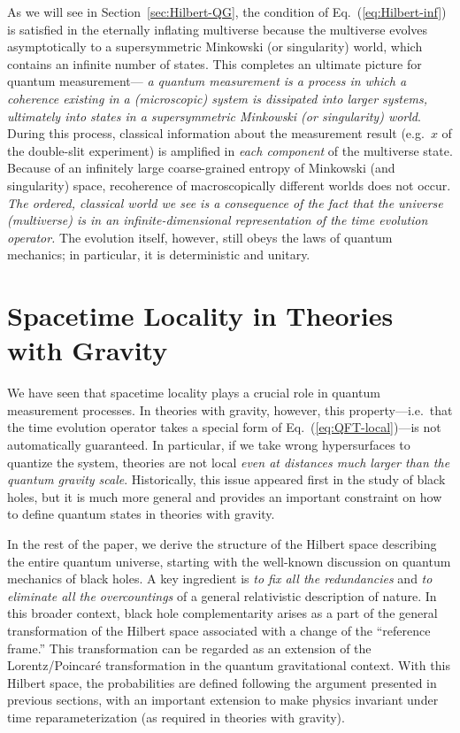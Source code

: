 \documentclass[12pt]{article}
\begin{document}
As we will see in Section~\ref{sec:Hilbert-QG}, the condition of 
Eq.~(\ref{eq:Hilbert-inf}) is satisfied in the eternally inflating 
multiverse because the multiverse evolves asymptotically to a supersymmetric 
Minkowski (or singularity) world, which contains an infinite number of 
states.  This completes an ultimate picture for quantum measurement---{\it 
a quantum measurement is a process in which a coherence existing in a 
(microscopic) system is dissipated into larger systems, ultimately into 
states in a supersymmetric Minkowski (or singularity) world}.  During 
this process, classical information about the measurement result (e.g.\ 
$x$ of the double-slit experiment) is amplified in {\it each component} 
of the multiverse state.  Because of an infinitely large coarse-grained 
entropy of Minkowski (and singularity) space, recoherence of macroscopically 
different worlds does not occur.  {\it The ordered, classical world we 
see is a consequence of the fact that the universe (multiverse) is in 
an infinite-dimensional representation of the time evolution operator.} 
The evolution itself, however, still obeys the laws of quantum mechanics; 
in particular, it is deterministic and unitary.


\section{Spacetime Locality in Theories with Gravity}
\label{sec:locality-grav}

We have seen that spacetime locality plays a crucial role in quantum 
measurement processes.  In theories with gravity, however, this 
property---i.e.\ that the time evolution operator takes a special 
form of Eq.~(\ref{eq:QFT-local})---is not automatically guaranteed. 
In particular, if we take wrong hypersurfaces to quantize the system, 
theories are not local {\it even at distances much larger than the quantum 
gravity scale}.  Historically, this issue appeared first in the study 
of black holes, but it is much more general and provides an important 
constraint on how to define quantum states in theories with gravity.

In the rest of the paper, we derive the structure of the Hilbert space 
describing the entire quantum universe, starting with the well-known 
discussion on quantum mechanics of black holes.  A key ingredient is {\it 
to fix all the redundancies} and {\it to eliminate all the overcountings} 
of a general relativistic description of nature.  In this broader 
context, black hole complementarity arises as a part of the general 
transformation of the Hilbert space associated with a change of the 
``reference frame.''  This transformation can be regarded as an extension 
of the Lorentz/Poincar\'{e} transformation in the quantum gravitational 
context.  With this Hilbert space, the probabilities are defined following 
the argument presented in previous sections, with an important extension 
to make physics invariant under time reparameterization (as required 
in theories with gravity).
\end{document}
